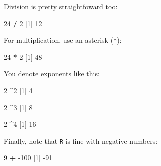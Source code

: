 \documentclass[]{book}
\newenvironment{Shaded}{\begin{snugshade}}{\end{snugshade}}
\newcommand{\DecValTok}[1]{\textcolor[rgb]{0.00,0.00,0.81}{#1}}
\newcommand{\NormalTok}[1]{#1}
\newcommand{\OperatorTok}[1]{\textcolor[rgb]{0.81,0.36,0.00}{\textbf{#1}}}
\newcommand{\StringTok}[1]{\textcolor[rgb]{0.31,0.60,0.02}{#1}}
\begin{document}
Division is pretty straightfoward too:

\begin{Shaded}
\begin{Highlighting}[]
\DecValTok{24} \OperatorTok{/}\StringTok{ }\DecValTok{2}
\NormalTok{[}\DecValTok{1}\NormalTok{] }\DecValTok{12}
\end{Highlighting}
\end{Shaded}

For multiplication, use an asterisk (\texttt{*}):

\begin{Shaded}
\begin{Highlighting}[]
\DecValTok{24} \OperatorTok{*}\StringTok{ }\DecValTok{2}
\NormalTok{[}\DecValTok{1}\NormalTok{] }\DecValTok{48}
\end{Highlighting}
\end{Shaded}

You denote exponents like this:

\begin{Shaded}
\begin{Highlighting}[]
\DecValTok{2} \OperatorTok{^}\DecValTok{2}
\NormalTok{[}\DecValTok{1}\NormalTok{] }\DecValTok{4}
\end{Highlighting}
\end{Shaded}

\begin{Shaded}
\begin{Highlighting}[]
\DecValTok{2} \OperatorTok{^}\DecValTok{3}
\NormalTok{[}\DecValTok{1}\NormalTok{] }\DecValTok{8}
\end{Highlighting}
\end{Shaded}

\begin{Shaded}
\begin{Highlighting}[]
\DecValTok{2} \OperatorTok{^}\DecValTok{4}
\NormalTok{[}\DecValTok{1}\NormalTok{] }\DecValTok{16}
\end{Highlighting}
\end{Shaded}

Finally, note that \texttt{R} is fine with negative numbers:

\begin{Shaded}
\begin{Highlighting}[]
\DecValTok{9} \OperatorTok{+}\StringTok{ }\DecValTok{-100}
\NormalTok{[}\DecValTok{1}\NormalTok{] }\DecValTok{-91}
\end{Highlighting}
\end{Shaded}
\end{document}
